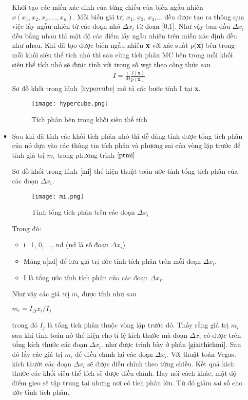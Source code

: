 \begin{itemize}
Khởi tạo các miền xác định của từng chiều của biến ngẫu nhiên $x(x_1, x_2, x_3, ..., x_n)$. Mỗi biến giá trị $x_1$, $x_2$, $x_3$,... 
đều được tạo ra thông qua việc lấy ngẫu nhiên từ các đoạn nhỏ ${\Delta}x_i$ từ đoạn [0,1]. Như vậy ban đầu ${\Delta}x_i$ đều bằng nhau thì mật độ các điểm lấy ngẫu nhiên trên miền xác định đều như nhau.
Khi đã tạo được biến ngẫu nhiên \textbf{x} với xác suất p(\textbf{x}) bên trong mỗi khối siêu thể tích nhỏ thì sau cùng tích phân MC bên trong mỗi khối siêu thể tích nhỏ sẽ được tính với trọng số wgt theo công thức sau
            \begin{align}
                  I={\frac{1}{M}}{{\frac{f(\textbf{x})}{p(\textbf{x})}}}\label{pt3.20}
            \end{align}
Sơ đồ khối trong hình $ \ref{hypercube} $ mô tả các bước tính I tại \textbf{x}.
\newline
            \begin{figure}[H]
                        \centering
                        \texttt{[image: hypercube.png]}
                        \caption{Tích phân bên trong khối siêu thể tích }\label{hypercube}
            \end{figure}
\item Sau khi đã tính các khối tích phân nhỏ thì dễ dàng tính được tổng tích phân của nó dựa vào các thông tin tích phân và phương sai của vòng lặp trước để tính giá trị $m_i$ trong phương trình $\ref{ptmi}$\par
Sơ đồ khối trong hình $ \ref{mi} $ thể hiện thuật toán ước tính tổng tích phân của các đoạn ${\Delta}x_i$.
\begin{figure}[H]
      \centering
      \texttt{[image: mi.png]}
      \caption{Tính tổng tích phân trên các đoạn ${\Delta}x_i$}\label{mi}
\end{figure}
Trong đó: 
\begin{itemize}
      \item i=1, 0, ..., nd (nd là số đoạn ${\Delta}x_i$)
      \item Mảng a[nd] để lưu giá trị ước tính tích phân trên mỗi đoạn ${\Delta}x_i$.
      \item I là tổng ước tính tích phân của các đoạn ${\Delta}x_i$.
\end{itemize}
Như vậy các giá trị $m_i$ được tính như sau
\begin{center}
      $m_i=I_{\Delta}x_i/I_j$
\end{center}
trong đó $I_j$ là tổng tích phân thuộc vòng lặp trước đó.
Thấy rằng giá trị $m_i$ sau khi tính toán nó thể hiện cho tỉ lệ kích thước mà đoạn ${\Delta}x_i$ có được trên tổng kích thước các đoạn ${\Delta}x_i$.
như được trình bày ở phần $ \ref{giaithichmi} $. Sau đó lấy các giá trị $m_i$ để điều chỉnh lại các đoạn ${\Delta}x_i$.
Với thuật toán Vegas, kích thướt các đoạn ${\Delta}x_i$ sẽ được điều chỉnh theo từng chiều. Kết quả kích thước các khối siêu thể tích sẽ được điều chỉnh.
Hay nói cách khác, mật độ điểm gieo sẽ tập trung tại nhưng nơi có tích phân lớn. Từ đó giảm sai số cho ước tính tích phân.


\end{itemize}
